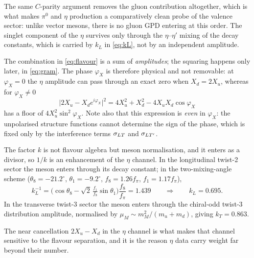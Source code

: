 The same $C$-parity argument removes the gluon contribution altogether, which
is what makes $\pi^0$ and $\eta$ production a comparatively clean probe of the
valence sector: unlike vector mesons, there is no gluon GPD entering at this
order.  The singlet component of the $\eta$ survives only through the
$\eta$--$\eta'$ mixing of the decay constants, which is carried by $k_L$ in
\eqref{eq:kL}, not by an independent amplitude.

The combination in \eqref{eq:flavour} is a sum of \emph{amplitudes}; the
squaring happens only later, in \eqref{eq:gram}.  The phase $\varphi_X$ is
therefore physical and not removable: at $\varphi_X = 0$ the $\eta$ amplitude
can pass through an exact zero when $X_d = 2X_u$, whereas for
$\varphi_X \neq 0$
\begin{equation}
\bigl|2X_u - X_d e^{i\varphi_X}\bigr|^2
 = 4X_u^2 + X_d^2 - 4X_uX_d\cos\varphi_X
\label{eq:floor}
\end{equation}
has a floor of $4X_u^2\sin^2\varphi_X$.  Note also that this expression is
\emph{even} in $\varphi_X$: the unpolarised structure functions cannot
determine the sign of the phase, which is fixed only by the interference terms
$\sigma_{LT}$ and $\sigma_{LT'}$.

The factor $k$ is not flavour algebra but meson normalisation, and it enters
as a divisor, so $1/k$ is an enhancement of the $\eta$ channel.  In the
longitudinal twist-2 sector the meson enters through its decay constant; in
the two-mixing-angle scheme ($\theta_8 = -21.2^\circ$, $\theta_1 = -9.2^\circ$,
$f_8 = 1.26 f_\pi$, $f_1 = 1.17 f_\pi$),
\begin{equation}
k_L^{-1} = \Big(\cos\theta_8 - \sqrt2\,\tfrac{f_1}{f_8}\sin\theta_1\Big)
           \frac{f_8}{f_\pi} = 1.439
\qquad\Longrightarrow\qquad k_L = 0.695 .
\label{eq:kL}
\end{equation}
In the transverse twist-3 sector the meson enters through the chiral-odd
twist-3 distribution amplitude, normalised by
$\mu_M \sim m_M^2/(m_u+m_d)$, giving $k_T = 0.863$.

The near cancellation $2X_u - X_d$ in the $\eta$ channel is what makes that
channel sensitive to the flavour separation, and it is the reason $\eta$ data
carry weight far beyond their number.

